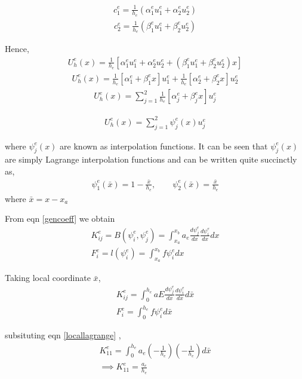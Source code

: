 \begin{eqnarray}
	c_1^{e} = \frac{1}{h_e} (\alpha_1^e u_1^e + \alpha_2^e u_2^e)
\end{eqnarray}
\begin{eqnarray}
	c_2^{e} = \frac{1}{h_e} (\beta_1^eu_1^e + \beta_2^e u_2^e)
\end{eqnarray}

Hence,
\begin{eqnarray*}
	U_h^e(x) =  \frac{1}{h_e} [\alpha_1^e u_1^e + \alpha_2^e u_2^e + (\beta_1^eu_1^e + \beta_2^e u_2^e)x]
\end{eqnarray*}
\begin{eqnarray*}
	U_h^e(x) =  \frac{1}{h_e} [\alpha_1^e + \beta_1^e x] u_1^e + \frac{1}{h_e} [\alpha_2^e + \beta_2^e x] u_2^e
\end{eqnarray*}
\begin{eqnarray}
U_h^e(x) = \sum_{j=1}^{2} \frac{1}{h_e} [\alpha_j^e + \beta_j^e x] u_j^e 
\end{eqnarray}

\begin{eqnarray}
	U_h^e(x) = \sum_{j=1}^{2} \psi_j^e(x) u_j^e 
\end{eqnarray}

where $\psi_j^e(x)$ are known as interpolation functions. It can be seen that $\psi_j^e(x)$ are simply Lagrange interpolation functions and can be written quite succinctly as,
\begin{eqnarray}\label{locallagrange}
	\psi_1^e(\bar{x}) = 1 - \frac{\bar{x}}{h_e} , \quad\quad \psi_2^e(\bar{x}) = \frac{\bar{x}}{h_e}
\end{eqnarray}
where $\bar{x} = x - x_a$

From eqn \ref{gencoeff} we obtain
\begin{eqnarray}
	K_{ij}^e = B(\psi_i^e , \psi_j^e) = \int_{x_a}^{x_b} a_e \frac{d\psi_j^e}{dx} \frac{d\psi_i^e}{dx} dx \\
	F_i^e = l(\psi_i^e) = \int_{x_a}^{x_b} f\psi_i^e dx
\end{eqnarray}

Taking local coordinate $\bar{x}$,
\begin{eqnarray}
	K_{ij}^e =  \int_{0}^{h_e} aE \frac{d\psi_j^e}{d\bar{x}} \frac{d\psi_i^e}{d\bar{x}} d\bar{x} \\
	F_i^e= \int_{0}^{h_e} f\psi_i^e d\bar{x}
\end{eqnarray}

subsituting eqn \ref{locallagrange} , 
\begin{eqnarray}
	K_{11}^e =  \int_{0}^{h_e} a_e \left( - \frac{1}{h_e}\right) \left( - \frac{1}{h_e}\right) d\bar{x} \\
	\implies K_{11}^e = \frac{a_e}{h_e}
\end{eqnarray}

